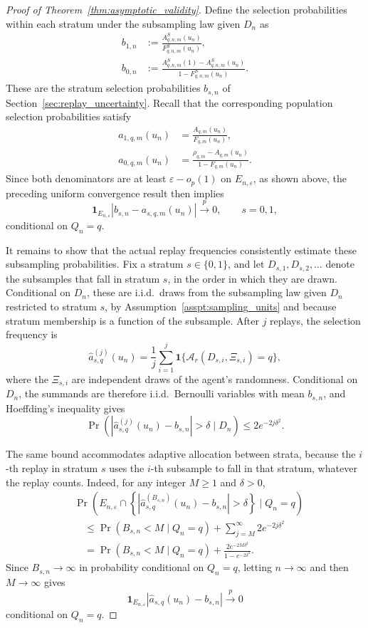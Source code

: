 \documentclass[10pt]{article}
\begin{document}
\begin{proof}[Proof of Theorem~\ref{thm:asymptotic_validity}]
Define the selection probabilities within each stratum under the subsampling law given $D_n$ as
\[
\begin{aligned}
b_{1,n}
&:=\frac{A_{q,n,m}^S(u_n)}
{F_{q,n,m}^S(u_n)},\\
b_{0,n}
&:=\frac{A_{q,n,m}^S(1)
-A_{q,n,m}^S(u_n)}
{1-F_{q,n,m}^S(u_n)}.
\end{aligned}
\]
These are the stratum selection probabilities $b_{s,n}$ of Section~\ref{sec:replay_uncertainty}. Recall that the corresponding population selection
probabilities satisfy
\[
\begin{aligned}
a_{1,q,m}(u_n)
&=\frac{A_{q,m}(u_n)}{F_{q,m}(u_n)},\\
a_{0,q,m}(u_n)
&=\frac{\rho_{q,m}-A_{q,m}(u_n)}
{1-F_{q,m}(u_n)}.
\end{aligned}
\]
Since both denominators are at least $\varepsilon-o_p(1)$ on $E_{n,\varepsilon}$, as shown above, the preceding uniform convergence result then implies
\[
\mathbf 1_{E_{n,\varepsilon}}
\left|b_{s,n}
-a_{s,q,m}(u_n)\right|
\stackrel{p}{\longrightarrow}0,
\qquad s=0,1,
\]
conditional on $Q_n=q$.

It remains to show that the actual replay frequencies
consistently estimate these subsampling probabilities. Fix a stratum
$s\in\{0,1\}$, and let $D_{s,1},D_{s,2},\ldots$ denote the subsamples that fall in stratum $s$, in the order in which they are drawn. Conditional on $D_n$, these are i.i.d.\ draws from the subsampling law given $D_n$ restricted to stratum $s$, by Assumption~\ref{asspt:sampling_units} and because stratum membership is a function of the subsample. After $j$ replays, the
selection frequency is
\[
\widehat a_{s,q}^{(j)}(u_n)
=\frac{1}{j}\sum_{i=1}^j
\mathbf{1}\{
\mathcal A_r(D_{s,i},\Xi_{s,i})=q
\},
\]
where the $\Xi_{s,i}$ are independent draws of the
agent's randomness. Conditional on $D_n$, the summands are therefore i.i.d.\ Bernoulli variables with mean $b_{s,n}$, and Hoeffding's inequality
\citep{hoeffding1963probability} gives
\[
\Pr\left(
\left|\widehat a_{s,q}^{(j)}(u_n)
-b_{s,n}\right|>\delta
\mid D_n
\right)
\le 2e^{-2j\delta^2}.
\]

The same bound accommodates adaptive allocation between strata, because the $i$-th replay in stratum $s$ uses the $i$-th subsample to fall in that stratum, whatever the replay counts.
Indeed, for any integer $M\ge1$ and $\delta>0$,
\[
\begin{aligned}
&\Pr\left(
E_{n,\varepsilon}\cap
\left\{
\left|\widehat a_{s,q}^{(B_{s,n})}(u_n)
-b_{s,n}\right|>\delta
\right\}
\mid Q_n=q
\right)\\
&\quad\le
\Pr(B_{s,n}<M\mid Q_n=q)
+\sum_{j=M}^{\infty}2e^{-2j\delta^2}\\
&\quad=
\Pr(B_{s,n}<M\mid Q_n=q)
+\frac{2e^{-2M\delta^2}}
{1-e^{-2\delta^2}}.
\end{aligned}
\]
Since $B_{s,n}\to\infty$ in probability conditional
on $Q_n=q$, letting $n\to\infty$ and then
$M\to\infty$ gives
\[
\mathbf1_{E_{n,\varepsilon}}
\left|\widehat a_{s,q}(u_n)
-b_{s,n}\right|
\stackrel{p}{\longrightarrow}0
\]
conditional on $Q_n=q$.


\end{proof}
\end{document}
